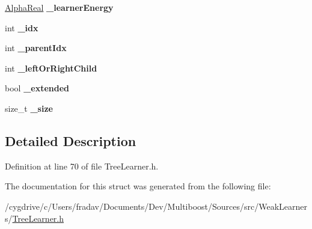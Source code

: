 \begin{DoxyCompactItemize}
\item 
\hypertarget{structMultiBoost_1_1NodePoint_afb231449d61b5e30eb97ef93953f6b24}{
\hyperlink{Defaults_8h_a80184c4fd10ab70a1a17c5f97dcd1563}{AlphaReal} {\bfseries \_\-learnerEnergy}}
\label{structMultiBoost_1_1NodePoint_afb231449d61b5e30eb97ef93953f6b24}

\item 
\hypertarget{structMultiBoost_1_1NodePoint_a6ac7d70fa3009637d4482f36d41cd42f}{
int {\bfseries \_\-idx}}
\label{structMultiBoost_1_1NodePoint_a6ac7d70fa3009637d4482f36d41cd42f}

\item 
\hypertarget{structMultiBoost_1_1NodePoint_a7ca3ff3a01584c45c967be54487241af}{
int {\bfseries \_\-parentIdx}}
\label{structMultiBoost_1_1NodePoint_a7ca3ff3a01584c45c967be54487241af}

\item 
\hypertarget{structMultiBoost_1_1NodePoint_aa90561ee93190c5b1628c7d93912bbb6}{
int {\bfseries \_\-leftOrRightChild}}
\label{structMultiBoost_1_1NodePoint_aa90561ee93190c5b1628c7d93912bbb6}

\item 
\hypertarget{structMultiBoost_1_1NodePoint_a2e373445d5bf6310ca0a669299b16eb3}{
bool {\bfseries \_\-extended}}
\label{structMultiBoost_1_1NodePoint_a2e373445d5bf6310ca0a669299b16eb3}

\item 
\hypertarget{structMultiBoost_1_1NodePoint_a0c1d809f9ba94241a072040b8252e1e3}{
size\_\-t {\bfseries \_\-size}}
\label{structMultiBoost_1_1NodePoint_a0c1d809f9ba94241a072040b8252e1e3}

\end{DoxyCompactItemize}


\subsection{Detailed Description}


Definition at line 70 of file TreeLearner.h.



The documentation for this struct was generated from the following file:\begin{DoxyCompactItemize}
\item 
/cygdrive/c/Users/fradav/Documents/Dev/Multiboost/Sources/src/WeakLearners/\hyperlink{TreeLearner_8h}{TreeLearner.h}\end{DoxyCompactItemize}
